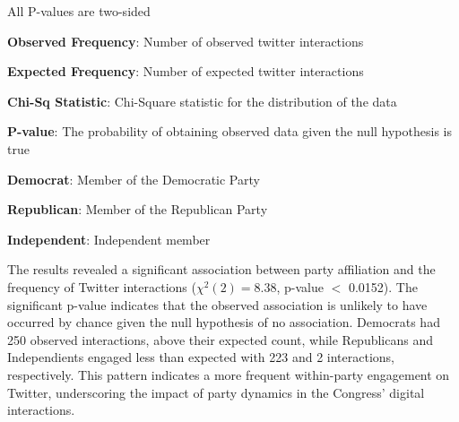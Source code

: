 \documentclass[11pt]{article}
\begin{document}
\begin{table}[h]
\caption{Chi-Square Test of Association Between Party Affiliation and Twitter Interactions}
\label{table:chi_sq_party}
\begin{threeparttable}
\renewcommand{\TPTminimum}{\linewidth}
\begin{tablenotes}
\footnotesize
\item All P-values are two-sided
\item \textbf{Observed Frequency}: Number of observed twitter interactions
\item \textbf{Expected Frequency}: Number of expected twitter interactions
\item \textbf{Chi-Sq Statistic}: Chi-Square statistic for the distribution of the data
\item \textbf{P-value}: The probability of obtaining observed data given the null hypothesis is true
\item \textbf{Democrat}: Member of the Democratic Party
\item \textbf{Republican}: Member of the Republican Party
\item \textbf{Independent}: Independent member
\end{tablenotes}
\end{threeparttable}
\end{table}


The results revealed a significant association between party affiliation and the frequency of Twitter interactions ($\chi^{2}(2) = 8.38$, p-value $<$ 0.0152). The significant p-value indicates that the observed association is unlikely to have occurred by chance given the null hypothesis of no association. Democrats had 250 observed interactions, above their expected count, while Republicans and Independients engaged less than expected with 223 and 2 interactions, respectively. This pattern indicates a more frequent within-party engagement on Twitter, underscoring the impact of party dynamics in the Congress' digital interactions.
\end{document}
